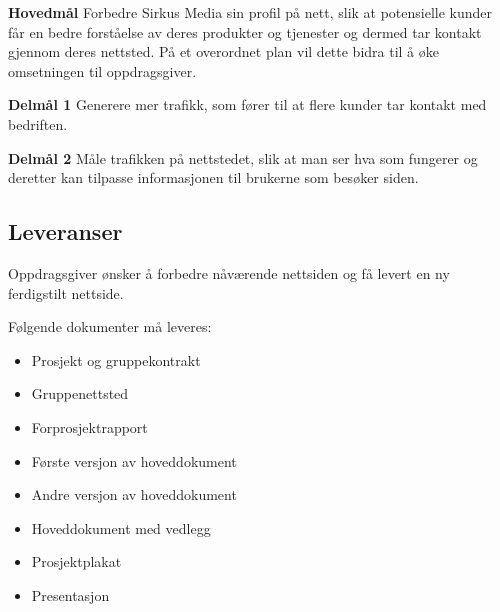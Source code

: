 \begin{compactitem}
\item [{\bf Hovedmål}] Forbedre Sirkus Media sin profil på nett, slik at potensielle kunder får en bedre forståelse av deres produkter og tjenester og dermed tar kontakt gjennom deres nettsted. På et overordnet plan vil dette bidra til å øke omsetningen til oppdragsgiver.
\begin{compactitem}
\item [{\bf  Delmål 1} ] Generere mer trafikk, som fører til at flere kunder tar kontakt med bedriften. 
\item [{\bf  Delmål 2} ] Måle trafikken på nettstedet, slik at man ser hva som fungerer og deretter kan tilpasse informasjonen til brukerne som besøker siden.
\end{compactitem}
\end{compactitem}

\subsection{Leveranser}
Oppdragsgiver ønsker å forbedre nåværende nettsiden og få levert en ny ferdigstilt nettside.

Følgende dokumenter må leveres:
\begin{itemize}
\item Prosjekt og gruppekontrakt
\item Gruppenettsted
\item Forprosjektrapport
\item Første versjon av hoveddokument
\item Andre versjon av hoveddokument
\item Hoveddokument med vedlegg
\item Prosjektplakat
\item Presentasjon
\end{itemize}

